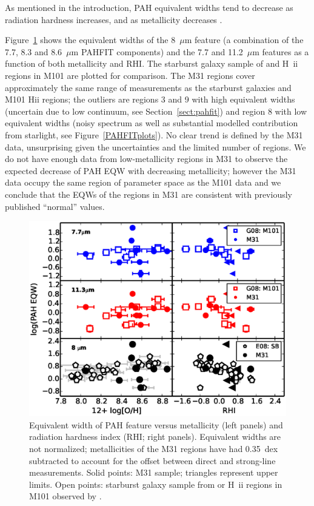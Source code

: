 As mentioned in the introduction, PAH equivalent widths tend to decrease as radiation hardness increases,
and as metallicity decreases \citep{Calzetti:2010fk}.  

Figure~\ref{rhi_met_eqw} shows the equivalent widths of the  8~$\mu$m feature 
(a combination of the 7.7, 8.3 and 8.6~$\mu$m PAHFIT components) and the 
 7.7 and 11.2~$\mu$m features as a function of both metallicity and RHI. The starburst galaxy sample of \citet{Engelbracht_2008} 
and  H~{\sc ii} regions in M101 \citep{Gordon:2008lr} are plotted for comparison.
The M31 regions cover approximately the same range of measurements as the starburst galaxies and M101 H{\sc ii} regions;
the outliers are regions 3 and 9 with high equivalent widths (uncertain due to low continuum, see Section~\ref{sect:pahfit}) and
region 8 with low equivalent widths (noisy spectrum as well as substantial modelled contribution from starlight, see Figure~\ref{PAHFITplots}).
No clear trend is defined by the M31 data, unsurprising given the uncertainties and the limited
number  of regions.
We do not have enough data from low-metallicity regions in M31 to observe the expected decrease of PAH EQW with decreasing 
metallicity; however the M31 data occupy the same region of parameter space as the M101 data
and we conclude that the EQWs of the regions in M31 are consistent with previously published ``normal'' values.


\begin{figure}
\centering
\includegraphics[scale=0.85]{./fig9.eps}
\caption{Equivalent width of  PAH feature versus metallicity (left panels) and radiation hardness index (RHI; right panels).
Equivalent  widths are not normalized; metallicities of the M31 regions have had 0.35~dex subtracted to account for the offset  between direct and strong-line measurements. 
Solid points: M31 sample; triangles represent upper limits. Open points:  starburst galaxy sample from \citet[bottom panels]{Engelbracht_2008} or
 H~{\sc ii} regions in M101 observed  by \citet[middle and top panels]{Gordon:2008lr}.  
}
\label{rhi_met_eqw}
\end{figure}



